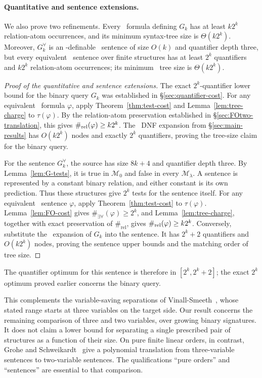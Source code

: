 \paragraph{Quantitative and sentence extensions.}
We also prove two refinements. Every \FOtwo\ formula defining $G_k$
has at least $k2^k$ relation-atom occurrences, and its minimum
syntax-tree size is $\Theta(k2^k)$. Moreover, $G_k^\forall$ is an
\FOtwo-definable \FOthree\ sentence of size $O(k)$ and quantifier
depth three, but every equivalent \FOtwo\ sentence over finite
structures has at least $2^k$ quantifiers and $k2^k$ relation-atom
occurrences; its minimum \FOtwo\ tree size is $\Theta(k2^k)$.
\begin{proof}[Proof of the quantitative and sentence extensions]
The exact $2^k$-quantifier lower bound for the binary query $G_k$
was established in \S\ref{sec:quantifier-cost}. For any equivalent \FOtwo\
formula $\varphi$, apply Theorem~\ref{thm:test-cost} and
Lemma~\ref{lem:tree-charge} to $\tau(\varphi)$. By the
relation-atom preservation established in \S\ref{sec:FOtwo-translation},
this gives
$\#_{\mathrm{rel}}(\varphi)\ge k2^k$. The \FOtwo\ DNF expansion from
\S\ref{sec:main-results} has $O(k2^k)$ nodes and exactly $2^k$
quantifiers, proving the tree-size claim for the binary query.

For the sentence $G_k^\forall$, the source has size $8k+4$ and
quantifier depth three. By Lemma~\ref{lem:G-tests}, it is true in
$\mathcal M_0$ and false in every $\mathcal M_\lambda$. A sentence
is represented by a constant binary relation, and either constant is
its own prediction. Thus these structures give $2^k$ tests for the
sentence itself. For any equivalent \FOtwo\ sentence $\varphi$,
apply Theorem~\ref{thm:test-cost} to $\tau(\varphi)$.
Lemma~\ref{lem:FO-cost} gives $\#_{\exists\forall}(\varphi)\ge2^k$,
and Lemma~\ref{lem:tree-charge}, together with exact preservation of
$\#_{\mathrm{rel}}$, gives $\#_{\mathrm{rel}}(\varphi)\ge k2^k$.
Conversely, substitute the \FOtwo\ expansion of $G_k$ into the
sentence. It has $2^k+2$ quantifiers and $O(k2^k)$ nodes, proving the
sentence upper bounds and the matching order of tree size.
\end{proof}
The quantifier optimum for this sentence is therefore in
$[2^k,2^k+2]$; the exact $2^k$ optimum proved earlier concerns the binary
query.

This complements the variable-saving separations of
Vinall-Smeeth~\citep[Theorem~2]{vinall-smeeth2024}, whose stated range starts at three
variables on the target side. Our result concerns the remaining comparison
of three and two variables, over growing binary signatures. It does not
claim a lower bound for separating a single prescribed pair of structures
as a function of their size. On pure finite linear orders, in contrast,
Grohe and Schweikardt~\citep[Theorem~4.3]{grohe-schweikardt2005} give a polynomial translation
from three-variable sentences to two-variable sentences. The qualifications
``pure orders'' and ``sentences'' are essential to that comparison.

